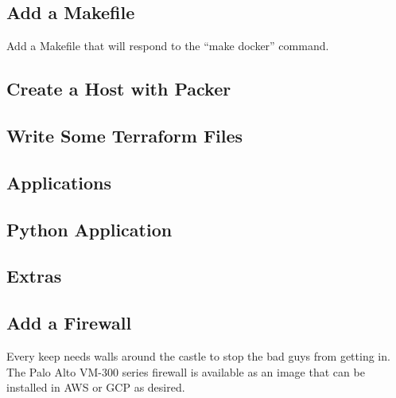 \subsection{Add a Makefile}
\justifying
Add a Makefile that will respond to the ``make docker'' command.

\subsection{Create a Host with Packer}

\subsection{Write Some Terraform Files}

\subsection{Applications}

\subsection{Python Application}

\subsection{Extras}

\subsection{Add a Firewall}

\justifying
Every keep needs walls around the castle to stop the bad guys from
getting in. The Palo Alto VM-300 series firewall is available as an
image that can be installed in AWS or GCP as desired.
